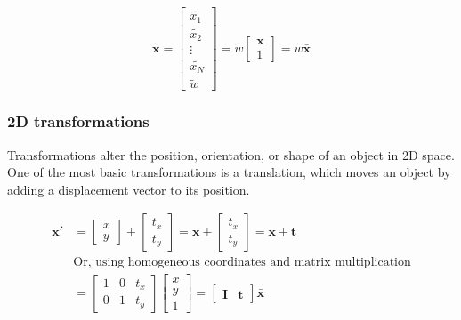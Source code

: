 \begin{equation}
    \tilde{\mathbf{x}} = \begin{bmatrix}
        \tilde{x_1} \\ \tilde{x_2} \\ \vdots \\ \tilde{x_N} \\ \tilde{w}
    \end{bmatrix} = \tilde{w}\begin{bmatrix}
        \mathbf{x}\\ 1
    \end{bmatrix} = \tilde{w}\bar{\mathbf{x}}
    \label{eq:homog-point}
\end{equation}

\subsubsection{2D transformations}
\label{sec:2d-transformations}
Transformations alter the position, orientation, or shape of an object in 2D space.
One of the most basic transformations is a translation, which moves an object by adding a displacement vector to its position.

\begin{equation}
    \begin{aligned}
        \mathbf{x'} &= \begin{bmatrix}
            x  \\ y 
        \end{bmatrix} + \begin{bmatrix}
            t_x \\ t_y
        \end{bmatrix} = \mathbf{x} + \begin{bmatrix}
            t_x \\ t_y
        \end{bmatrix} = \mathbf{x} + \mathbf{t}\\
        &\text{Or, using homogeneous coordinates and matrix multiplication} \\
        &= \begin{bmatrix}
            1 & 0 & t_x \\ 0 & 1 & t_y
        \end{bmatrix} \begin{bmatrix}
            x \\ y \\ 1
        \end{bmatrix} = \begin{bmatrix}
            \mathbf{I} & \mathbf{t}
        \end{bmatrix}\bar{\mathbf{x}} \\
    \end{aligned}
    \label{eq:translation}
\end{equation}

